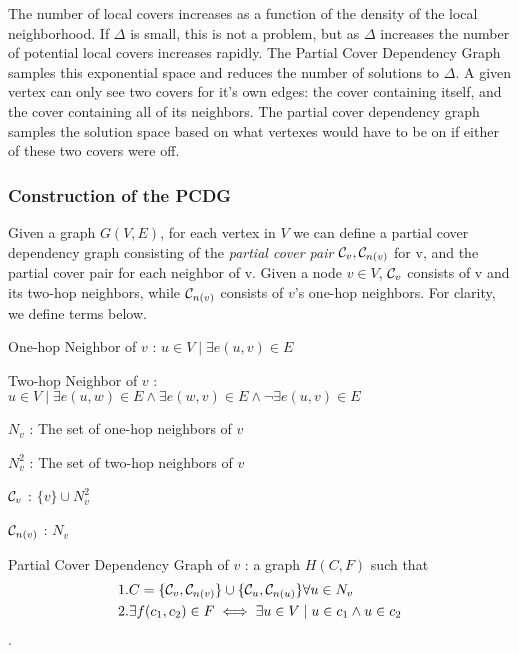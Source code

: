 The number of local covers increases as a function of the density of the local neighborhood. If $\Delta$ is small, this is not a problem, but as $\Delta$ increases the number of potential local covers increases rapidly. The Partial Cover Dependency Graph samples this exponential space and reduces the number of solutions to $\Delta$. A given vertex can only see two covers for it's own edges: the cover containing itself, and the cover containing all of its neighbors. The partial cover dependency graph samples the solution space based on what vertexes would have to be on if either of these two covers were off. 

\subsubsection{Construction of the PCDG}

Given a graph $G(V,E)$, for each vertex in $V$ we can define a partial cover dependency graph consisting of the {\em partial cover pair} ${\mathcal C}_v, {\mathcal C}_{n(v)}$ for v, and the partial cover pair for each neighbor of v. Given a node $v \in V$, ${\mathcal C}_v$ consists of v and its two-hop neighbors, while ${\mathcal C}_{n(v)}$ consists of $v$'s one-hop neighbors. For clarity, we define terms below.

\begin{defn}
One-hop Neighbor of $v$ : $u \in V \mid \exists e(u,v) \in E$
\end{defn}

\begin{defn}
Two-hop Neighbor of $v$ : $u \in V \mid \exists e(u,w) \in E \land \exists e(w,v) \in E \land \neg\exists e(u,v) \in E$
\end{defn}

\begin{defn}
$N_v$ : The set of one-hop neighbors of $v$
\end{defn}
\begin{defn}
$N_v^2$ : The set of two-hop neighbors of $v$
\end{defn}

\begin{defn}
${\mathcal C}_v$ : $\{v\} \cup N_v^2$
\end{defn}

\begin{defn}
${\mathcal C}_{n(v)}$ : $N_v$
\end{defn} 

\begin{defn}
Partial Cover Dependency Graph of $v$ : a graph $H(C,F)$ such that \begin{align*}& 1. C = \{{\mathcal C}_v, {\mathcal C}_{n(v)}\} \cup \{{\mathcal C}_u, {\mathcal C}_{n(u)}\} \forall u \in N_v\\ & 2. \exists f(c_1, c_2) \in F \iff \exists u \in V \mid u \in c_1 \land u \in c_2\end{align*}.
\end{defn} 

